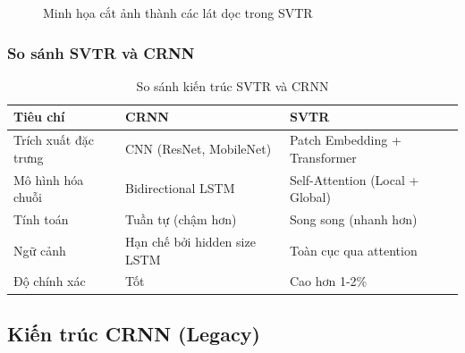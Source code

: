 \begin{figure}[!htbp]
    \centering
    \caption{Minh họa cắt ảnh thành các lát dọc trong SVTR}
    \label{fig:svtr_slices}
\end{figure}

\subsubsection{So sánh SVTR và CRNN}

\begin{table}[!ht]
\centering
\caption{So sánh kiến trúc SVTR và CRNN}
\label{tab:svtr_vs_crnn}
\begin{tabular}{|l|p{5cm}|p{5cm}|}
\hline
\textbf{Tiêu chí} & \textbf{CRNN} & \textbf{SVTR} \\ \hline
Trích xuất đặc trưng & CNN (ResNet, MobileNet) & Patch Embedding + Transformer \\ \hline
Mô hình hóa chuỗi & Bidirectional LSTM & Self-Attention (Local + Global) \\ \hline
Tính toán & Tuần tự (chậm hơn) & Song song (nhanh hơn) \\ \hline
Ngữ cảnh & Hạn chế bởi hidden size LSTM & Toàn cục qua attention \\ \hline
Độ chính xác & Tốt & Cao hơn 1-2\% \\ \hline
\end{tabular}
\end{table}

\subsection{Kiến trúc CRNN (Legacy)}

